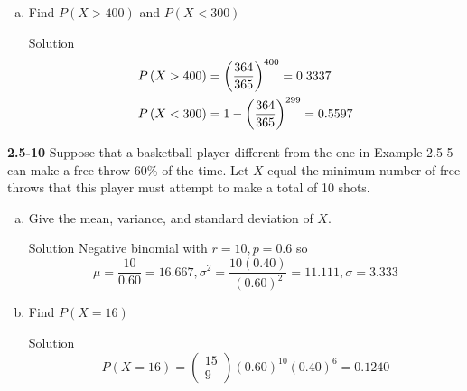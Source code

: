 \documentclass{article}
\begin{document}
\begin{spacing}{1.1}
\begin{homeworkProblem}
\begin{enumerate}[(a)]
			\begin{homeworkSection}{Solution}
				\[\begin{gathered}
  \mu  = \frac{1}{{\frac{1}{{365}}}} = 365 \hfill \\
  {\sigma ^2} = \frac{{\frac{{364}}{{365}}}}{{{{\left( {\frac{1}{{365}}} \right)}^2}}} = 132,860 \hfill \\
  \sigma  = 364.500 \hfill \\ 
\end{gathered} \]
			\end{homeworkSection}
		\item Find $P(X > 400)$ and $P(X < 300)$
			\begin{homeworkSection}{Solution}
				\[\begin{gathered}
  P\left( {X > 400} \right) = {\left( {\frac{{364}}{{365}}} \right)^{400}} = 0.3337 \hfill \\
  P\left( {X < 300} \right) = 1 - {\left( {\frac{{364}}{{365}}} \right)^{299}} = 0.5597 \hfill \\ 
\end{gathered} \]
			\end{homeworkSection}
	\end{enumerate}
\end{homeworkProblem}
\begin{homeworkProblem}
	{\bf 2.5-10} Suppose that a basketball player different from the one in Example 2.5-5 can make a free throw 60\% of the time.  Let $X$ equal the minimum number of free throws that this player must attempt to make a total of 10 shots.
	\begin{enumerate}[(a)]
		\item Give the mean, variance, and standard deviation of $X$.
			\begin{homeworkSection}{Solution}
				Negative binomial with $r = 10, p = 0.6$ so 
				\[\mu  = \frac{{10}}{{0.60}} = 16.667,{\sigma ^2} = \frac{{10\left( {0.40} \right)}}{{{{\left( {0.60} \right)}^2}}} = 11.111,\sigma  = 3.333\]
			\end{homeworkSection}
		\item Find $P(X = 16)$
			\begin{homeworkSection}{Solution}
				\[P\left( {X = 16} \right) = \left( {\begin{array}{*{20}{c}}
  {15} \\ 
  9 
\end{array}} \right){\left( {0.60} \right)^{10}}{\left( {0.40} \right)^6} = 0.1240\]

\end{homeworkSection}
\end{enumerate}
\end{homeworkProblem}
\end{spacing}
\end{document}
